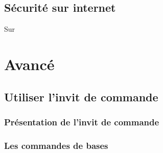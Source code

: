 \documentclass[12pt]{book}
\begin{document}
	\section{Sécurité sur internet}
		Sur

\chapter{Avancé}
\section{Utiliser l'invit de commande}\label{sec:utiliserterminal}
	\subsection{Présentation de l'invit de commande}
	\subsection{Les commandes de bases}
\end{document}
